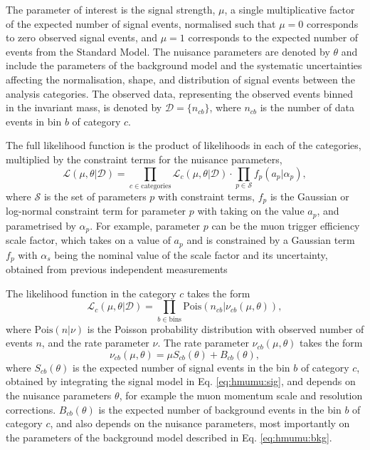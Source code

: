 The parameter of interest is the signal strength, $\mu$, a single
multiplicative factor of the expected number of signal events,
normalised such that $\mu = 0$ corresponds to zero observed signal
events, and $\mu=1$ corresponds to the expected number of events
from the Standard Model.
The nuisance parameters are denoted by $\theta$ and include the 
parameters of the background model and the systematic
uncertainties affecting the normalisation, shape, and distribution
of signal events between the analysis categories. The observed data,
representing the observed events binned in the invariant mass, is
denoted by $\mathcal{D} = \{n_{cb}\}$, where $n_{cb}$ is the number of
data events in bin $b$ of category $c$.

The full likelihood function is the product of likelihoods
in each of the categories, multiplied by the constraint 
terms for the nuisance parameters,
\begin{equation}
\mathcal{L}(\mu, \theta | \mathcal{D}) =
\prod_{c \in \text{categories}} \mathcal{L}_c(\mu, \theta | \mathcal{D}) \cdot
\prod_{p \in \mathcal{S}} f_p (a_p | \alpha_p),
\end{equation}
where $\mathcal{S}$ is the set of parameters $p$ with constraint
terms, $f_p$ is the Gaussian or log-normal constraint term for parameter $p$
with taking on the value $a_p$, and parametrised by $\alpha_p$. For example, parameter
$p$ can be the muon trigger efficiency scale factor, which takes on a
value of $a_p$ and is constrained by a Gaussian term $f_p$ with
$\alpha_s$ being the nominal value of the scale factor and its uncertainty,
obtained from previous independent measurements

The likelihood function in the category $c$ takes the form
\begin{equation}
\mathcal{L}_c (\mu, \theta | \mathcal{D}) =
\prod_{b \in \text{bins}} \text{Pois}(n_{cb} | \nu_{cb} (\mu, \theta)),
\end{equation}
where $\text{Pois}(n | \nu)$ is the Poisson probability distribution
with observed number of events $n$, and the rate parameter $\nu$.
The rate parameter $\nu_{cb}(\mu, \theta)$ takes the form
\begin{equation}
\nu_{cb}(\mu, \theta) = \mu S_{cb}(\theta) + B_{cb}(\theta),
\end{equation}
where $S_{cb}(\theta)$ is the expected number of signal events in
the bin $b$ of category $c$, obtained by integrating the signal
model in Eq. \ref{eq:hmumu:sig}, and depends on the nuisance
parameters $\theta$, for example the muon momentum scale
and resolution corrections. $B_{cb}(\theta)$ is the expected
number of background events in the bin $b$ of category $c$, and
also depends on the nuisance parameters, most importantly on the
parameters of the background model described in Eq. \ref{eq:hmumu:bkg}.

